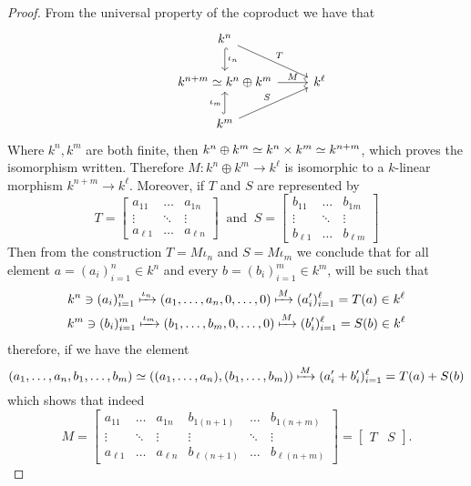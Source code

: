 \begin{proof}
From the universal property of the coproduct we have that
\[
  \begin{tikzcd}
    &k^n \ar[hook, "\iota_n", d]  \ar[dr, "T"]& \\
    & k^{n+m} \iso k^n \oplus k^m \ar[r, "M"] &k^\ell \\
    &k^m \ar[hook, "\iota_m", u] \ar[ur, "S"] &
  \end{tikzcd}
\]
Where \(k^n, k^m\) are both finite, then \(k^n \oplus k^m \simeq k^n \times k^m
\simeq k^{n+m}\), which proves the isomorphism written. Therefore \(M : k^n
\oplus k^m \to k^\ell\) is isomorphic to a \(k\)-linear morphism \(k^{n+m}
\to k^\ell\). Moreover, if \(T\) and \(S\) are represented by
\[
T =
\begin{bmatrix}
  a_{11} &\dots &a_{1n} \\
  \vdots &\ddots &\vdots \\
  a_{\ell 1} &\dots & a_{\ell n}
\end{bmatrix}
\ \text{ and }\
S =
\begin{bmatrix}
  b_{11} &\dots &b_{1m} \\
  \vdots &\ddots &\vdots \\
  b_{\ell 1} &\dots & b_{\ell m}
\end{bmatrix}
\]
Then from the construction \(T = M  \iota_n\) and \(S = M
\iota_m\) we conclude that for all element \(a = (a_i)_{i=1}^n \in k^n\) and
every \(b = (b_i)_{i=1}^m \in k^m\), will be such that
\begin{gather*}
  k^n \ni (a_i)_{i=1}^n \xmapsto{\iota_n} (a_1, \dots, a_n, 0, \dots, 0)
  \xmapsto{M} (a'_i)_{i=1}^\ell = T(a) \in k^\ell
  \\
  k^m \ni (b_i)_{i=1}^m \xmapsto{\iota_m} (b_1, \dots, b_m, 0, \dots, 0)
  \xmapsto{M} (b'_i)_{i=1}^\ell = S(b) \in k^\ell
\end{gather*}
therefore, if we have the element
\[
  (a_1, \dots, a_n, b_1, \dots, b_m) \simeq \left( (a_1, \dots, a_n), (b_1,
  \dots, b_m) \right) \xmapsto M (a'_i + b'_i)_{i=1}^\ell = T(a) + S(b)
\]
which shows that indeed
\[
  M =
  \begin{bmatrix}
    a_{11} &\dots &a_{1n} &b_{1(n+1)} &\dots &b_{1(n+m)} \\
    \vdots &\ddots &\vdots &\vdots &\ddots &\vdots\\
    a_{\ell 1} &\dots & a_{\ell n} &b_{\ell (n+1)} &\dots &b_{\ell(n+m)}
  \end{bmatrix}
  =
  \begin{bmatrix}
    T &S
  \end{bmatrix}
  .
\]
\end{proof}
